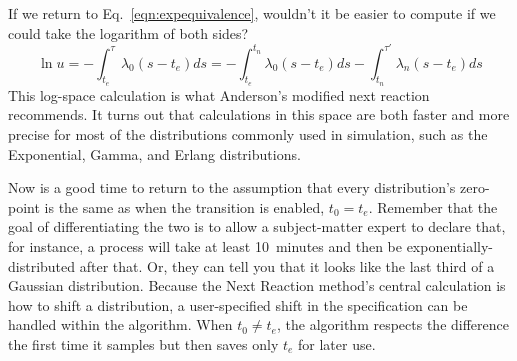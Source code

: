 \documentclass{article}
\begin{document}
If we return to Eq.~\ref{eqn:expequivalence}, wouldn't it be easier to compute if we could take the logarithm of both sides?
\begin{equation}
	\ln u=-\int_{t_e}^{\tau}\lambda_0(s-t_e)ds = -\int_{t_e}^{t_n}\lambda_0(s-t_e)ds - \int_{t_n}^{\tau'}\lambda_{n}(s-t_e)ds\label{eqn:logequivalence}
\end{equation}
This log-space calculation is what Anderson's modified next reaction recommends. It turns out that calculations in this space are both faster and more precise for most of the distributions commonly used in simulation, such as the Exponential, Gamma, and Erlang distributions.

Now is a good time to return to the assumption that every distribution's zero-point is the same as when the transition is enabled, $t_0=t_e$. Remember that the goal of differentiating the two is to allow a subject-matter expert to declare that, for instance, a process will take at least 10~minutes and then be exponentially-distributed after that. Or, they can tell you that it looks like the last third of a Gaussian distribution. Because the Next Reaction method's central calculation is how to shift a distribution, a user-specified shift in the specification can be handled within the algorithm. When $t_0\ne t_e$, the algorithm respects the difference the first time it samples but then saves only $t_e$ for later use.
\end{document}
